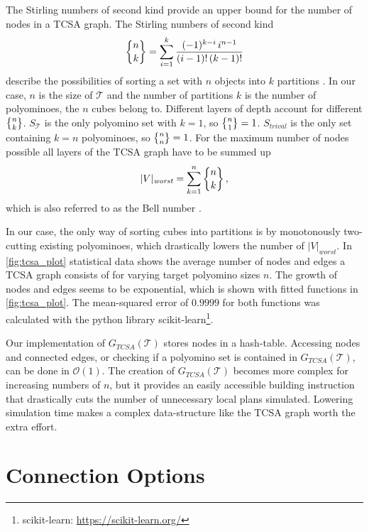 The Stirling numbers of second kind provide an upper bound for the number of nodes in a TCSA graph.
The Stirling numbers of second kind
\begin{equation}
\bracenom{n}{k} = \sum_{i=1}^{k} \frac{(-1)^{k-i} \, i^{n-1}}{(i-1)! \, (k-1)!}
\end{equation}
describe the possibilities of sorting a set with $n$ objects into $k$ partitions \cite{jelliss1991}.
In our case, $n$ is the size of $\mathcal{T}$ and the number of partitions $k$ is the number of polyominoes, the $n$ cubes belong to.
Different layers of depth account for different $\bracenom{n}{k}$.
$S_\mathcal{T}$ is the only polyomino set with $k=1$, so $\bracenom{n}{1} = 1$.
$S_\textit{trival}$ is the only set containing $k=n$ polyominoes, so $\bracenom{n}{n} = 1$.
For the maximum number of nodes possible all layers of the TCSA graph have to be summed up
\begin{equation}
|V|_\textit{worst} = \sum_{k=1}^{n} \bracenom{n}{k} \, ,
\end{equation}
which is also referred to as the Bell number \cite{jelliss1991}.

In our case, the only way of sorting cubes into partitions is by monotonously two-cutting existing polyominoes, which drastically lowers the number of $|V|_\textit{worst}$.
In \autoref{fig:tcsa_plot} statistical data shows the average number of nodes and edges a TCSA graph consists of for varying target polyomino sizes $n$.
The growth of nodes and edges seems to be exponential, which is shown with fitted functions in \autoref{fig:tcsa_plot}.
The mean-squared error of $0.9999$ for both functions was calculated with the python library scikit-learn\footnote{scikit-learn: \url{https://scikit-learn.org/}}.

Our implementation of $G_{\textit{TCSA}}(\mathcal{T})$ stores nodes in a hash-table.
Accessing nodes and connected edges, or checking if a polyomino set is contained in $G_{\textit{TCSA}}(\mathcal{T})$, can be done in  $\mathcal{O}(1)$.
The creation of $G_{\textit{TCSA}}(\mathcal{T})$ becomes more complex for increasing numbers of $n$, but it provides an easily accessible building instruction that drastically cuts the number of unnecessary local plans simulated.
Lowering simulation time makes a complex data-structure like the TCSA graph worth the extra effort.


\section{Connection Options}
\label{sec:connect_options}

